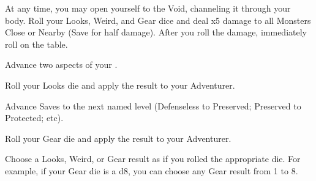 \begin{multicols*}{2}


At any time, you may open yourself to the Void, channeling it through your body. Roll your Looks, Weird, and Gear dice and deal \SUM x5 damage to all Monsters Close or Nearby (Save for half damage). After you roll the damage, immediately roll on the  table.


Advance two  aspects of your  \DCUP. 



Roll your Looks die and apply the result to your Adventurer.

\cbreak


Advance  Saves to the next named level (Defenseless to Preserved; Preserved to Protected; etc). 


Roll your Gear die and apply the result to your Adventurer.


Choose a Looks, Weird, or Gear result as if you rolled the appropriate die.  For example, if your Gear die is a d8, you can choose any Gear result from 1 to 8.

\end{multicols*}
